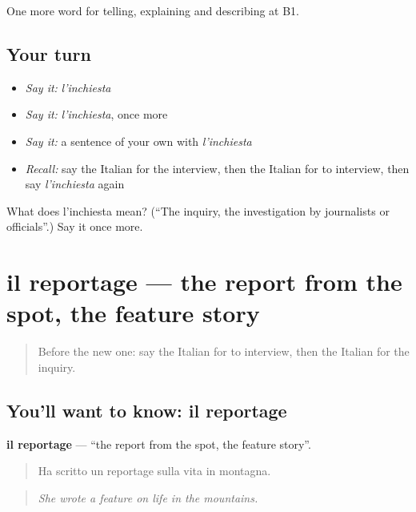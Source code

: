 \begin{grammarlens}[title={What you've built}]
One more word for telling, explaining and describing at B1.
\end{grammarlens}

\subsection*{Your turn}
\begin{itemize}
\raggedright
  \item \emph{Say it:} \emph{l'inchiesta}
  \item \emph{Say it:} \emph{l'inchiesta}, once more
  \item \emph{Say it:} a sentence of your own with \emph{l'inchiesta}
  \item \emph{Recall:} say the Italian for the interview, then the Italian for to interview, then say \emph{l'inchiesta} again
\end{itemize}

\begin{tcolorbox}[breakable,colback=teal!4,colframe=teal!35!black,title={Before you move on}]
What does l'inchiesta mean? (\textquotedblleft{}The inquiry, the investigation by journalists or officials\textquotedblright{}.) Say it once more.
\end{tcolorbox}
\section[il reportage]{il reportage — the report from the spot, the feature story}

\label{lesson:IT-C284-reportage}



\begin{quote}
Before the new one: say the Italian for to interview, then the Italian for the inquiry.
\end{quote}

\subsection*{You'll want to know: il reportage}
\textbf{il reportage} — \textquotedblleft{}the report from the spot, the feature story\textquotedblright{}.

\begin{quote}
Ha scritto un reportage sulla vita in montagna.
\end{quote}

\begin{quote}
\emph{She wrote a feature on life in the mountains.}
\end{quote}

